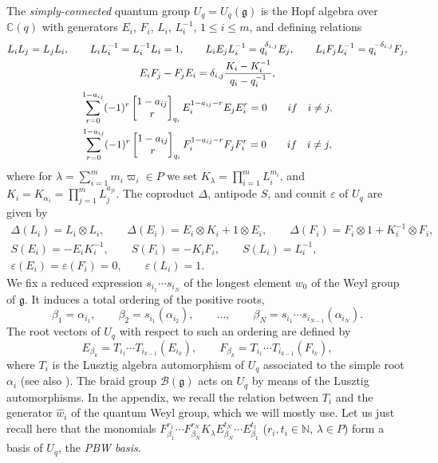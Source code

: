 \documentclass[11pt]{article}
\numberwithin{equation}{section}
\numberwithin{equation}{section}
\theoremstyle{definition}
\newcommand{\mn}{\mathbb{N}}
\begin{document}
The {\it simply-connected} quantum group $U_q = U_q(\mathfrak{g})$ is the Hopf algebra over $\mathbb {C}(q)$ with generators $E_i$, $F_i$, $L_i$, $L_i^{-1}$, $1\leq i \leq m$, and defining relations
\begin{gather*}%
L_iL_j=L_jL_i , \qquad L_iL_i^{-1}=L_i^{-1}L_i=1,\qquad L_iE_jL_i^{-1}=q_i^{\delta_{i,j}}E_j ,\qquad L_iF_jL_i^{-1}=q_i^{-\delta_{i,j}}F_j, \\
E_iF_j-F_jE_i=\delta_{i,j}\frac{K_i-K_i^{-1}}{q_i-q_i^{-1}},\\
\sum_{r=0}^{1-a_{ij}} (-1)^r \left[\begin{matrix} 1-a_{ij} \\ r \end{matrix}\right]_{q_i} E_i^{1-a_{ij}-r}E_jE_i^{r} = 0 \qquad {\rm if}\quad i\ne j,\\
\sum_{r=0}^{1-a_{ij}} (-1)^r \left[\begin{matrix} 1-a_{ij} \\ r \end{matrix}\right]_{q_i} F_i^{1-a_{ij}-r}F_jF_i^{r} = 0 \qquad {\rm if}\quad i\ne j,
\end{gather*}
where for $ \lambda=\sum_{i=1}^m m_i \varpi_i \in P$ we set $ K_\lambda=\prod_{i=1}^m L_i^{m_i}$, and $ K_i=K_{\alpha_i}=\prod_{j=1}^m L_j^{a_{ji}}$.
The coproduct $\Delta$, antipode $S$, and counit $\varepsilon$ of $U_q$ are given by
\begin{gather*}
\Delta(L_i)=L_i\otimes L_i ,\qquad \Delta(E_i)=E_i\otimes K_i+1\otimes E_i ,\qquad \Delta(F_i)=F_i\otimes 1 + K_i^{-1}\otimes F_i, \\ S(E_i) = -E_iK_i^{-1},\qquad S(F_i) = -K_iF_i ,\qquad S(L_i) = L_i^{- 1},\\ \varepsilon(E_i) = \varepsilon(F_i)=0,\qquad \varepsilon(L_i)=1.
\end{gather*}
We fix a reduced expression $s_{i_1}\cdots s_{i_N}$ of the longest element $w_0$ of the Weyl group of $\mathfrak{g}$. It induces a total ordering of the positive roots,
\[\beta_1 = \alpha_{i_1},\qquad \beta_2 = s_{i_1}(\alpha_{i_2}), \qquad \dots, \qquad\beta_N = s_{i_1}\cdots s_{i_{N-1}}(\alpha_{i_N}).\]
The root vectors of $U_q$ with respect to such an ordering are defined by
\begin{equation}\label{rootvectdef}
E_{\beta_k} = T_{i_1}\cdots T_{i_{k-1}}(E_{i_k}) ,\qquad F_{\beta_k} = T_{i_1}\cdots T_{i_{k-1}}(F_{i_k}),
\end{equation}
where $T_i$ is the Lusztig algebra automorphism of $U_q$ associated to the simple root $\alpha_i$ \mbox{\cite{Lusztig2,Lusztig}} (see also \cite[Chapter~8]{CP}). The braid group $\mathcal{B}(\mathfrak{g})$ acts on $U_q$ by means of the Lusztig automorphisms. In the appendix, we recall the relation between $T_i$ and the generator $\hat{w}_i$ of the quantum Weyl group, which we will mostly use. Let us just recall here that the monomials $F_{\beta_1}^{r_1}\cdots F_{\beta_N}^{r_N}K_\lambda E_{\beta_N}^{t_N}\cdots E_{\beta_1}^{t_1}$ ($r_i,t_i\in \mn$, $\lambda\in P$) form a basis of $U_q$, the {\it PBW basis}.
\end{document}
